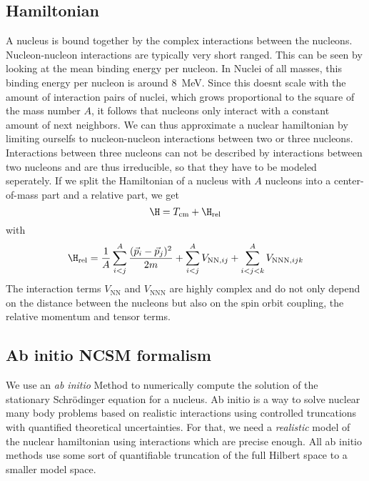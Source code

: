 \subsection{Hamiltonian}
A nucleus is bound together by the complex interactions between the nucleons. Nucleon-nucleon interactions are typically very short ranged. This can be seen by looking at the mean binding energy per nucleon. In Nuclei of all masses, this binding energy per nucleon is around \SI{8}{\mega\electronvolt}. Since this doesnt scale with the amount of interaction pairs of nuclei, which grows proportional to the square of the mass number $A$, it follows that nucleons only interact with a constant amount of next neighbors. We can thus approximate a nuclear hamiltonian by limiting ourselfs to nucleon-nucleon interactions between two or three nucleons. Interactions between three nucleons can not be described by interactions between two nucleons and are thus irreducible, so that they have to be modeled seperately. If we split the Hamiltonian of a nucleus with $A$ nucleons into a center-of-mass part and a relative part, we get
\begin{equation}
  \H = T_{\mathrm{cm}} + \H_{\mathrm{rel}}
\end{equation}
with
\begin{equation}
  \H_{\mathrm{rel}} = \frac{1}{A}\sum_{i<j}^A\frac{(\vec{p}_i - \vec{p}_j)^2}{2m} + \sum_{i<j}^A V_{\mathrm{NN}, ij} + \sum_{i<j<k}^AV_{\mathrm{NNN}, ijk}
\end{equation}
The interaction terms $V_\mathrm{NN}$ and $V_\mathrm{NNN}$ are highly complex and do not only depend on the distance between the nucleons but also on the spin orbit coupling, the relative momentum and tensor terms.
\subsection{Ab initio NCSM formalism}
We use an \textit{ab initio} Method to numerically compute the solution of the stationary Schrödinger equation for a nucleus. Ab initio is a way to solve nuclear many body problems based on realistic interactions using controlled truncations with quantified theoretical uncertainties. For that, we need a \textit{realistic} model of the nuclear hamiltonian using interactions which are precise enough. All ab initio methods use some sort of quantifiable truncation of the full Hilbert space to a smaller model space.


